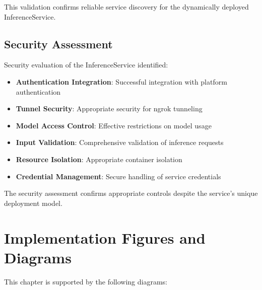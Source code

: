 This validation confirms reliable service discovery for the dynamically deployed InferenceService.

\subsection{Security Assessment}

Security evaluation of the InferenceService identified:

\begin{itemize}
    \item \textbf{Authentication Integration}: Successful integration with platform authentication
    \item \textbf{Tunnel Security}: Appropriate security for ngrok tunneling
    \item \textbf{Model Access Control}: Effective restrictions on model usage
    \item \textbf{Input Validation}: Comprehensive validation of inference requests
    \item \textbf{Resource Isolation}: Appropriate container isolation
    \item \textbf{Credential Management}: Secure handling of service credentials
\end{itemize}

The security assessment confirms appropriate controls despite the service's unique deployment model.

\section{Implementation Figures and Diagrams}

This chapter is supported by the following diagrams:




